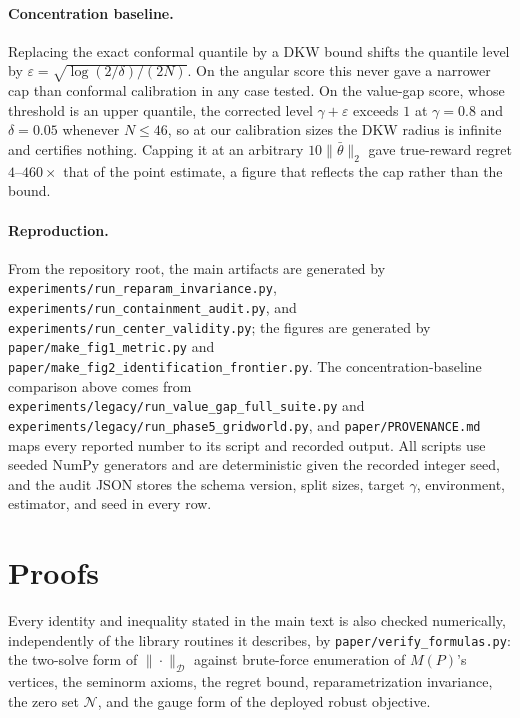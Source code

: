 \documentclass{article}
\newcommand{\Dnorm}[1]{\|#1\|_{\mathcal D}}
\begin{document}
\paragraph{Concentration baseline.} Replacing the exact conformal quantile by a
DKW bound shifts the quantile level by $\varepsilon=\sqrt{\log(2/\delta)/(2N)}$.
On the angular score this never gave a narrower cap than conformal calibration
in any case tested. On the value-gap score, whose threshold is an upper
quantile, the corrected level $\gamma+\varepsilon$ exceeds $1$ at $\gamma=0.8$
and $\delta=0.05$ whenever $N\le46$, so at our calibration sizes the DKW radius
is infinite and certifies nothing. Capping it at an arbitrary
$10\|\bar\theta\|_2$ gave true-reward regret $4$--$460\times$ that of the point
estimate, a figure that reflects the cap rather than the bound.

\paragraph{Reproduction.} From the repository root, the main artifacts are
generated by \texttt{experiments/run\_reparam\_invariance.py},
\texttt{experiments/run\_containment\_audit.py}, and
\texttt{experiments/run\_center\_validity.py}; the figures are generated by
\texttt{paper/make\_fig1\_metric.py} and
\texttt{paper/make\_fig2\_identification\_frontier.py}. The concentration-baseline
comparison above comes from \texttt{experiments/legacy/run\_value\_gap\_full\_suite.py}
and \texttt{experiments/legacy/run\_phase5\_gridworld.py}, and
\texttt{paper/PROVENANCE.md} maps every reported number to its script and
recorded output. All scripts use seeded NumPy generators and are deterministic
given the recorded integer seed, and the audit JSON stores the
schema version, split sizes, target $\gamma$, environment, estimator, and seed
in every row.

\section{Proofs}
\label{app:proofs}

Every identity and inequality stated in the main text is also checked
numerically, independently of the library routines it describes, by
\texttt{paper/verify\_formulas.py}: the two-solve form of $\Dnorm{\cdot}$
against brute-force enumeration of $M(P)$'s vertices, the seminorm axioms, the
regret bound, reparametrization invariance, the zero set $\mathcal N$, and the
gauge form of the deployed robust objective.
\end{document}
